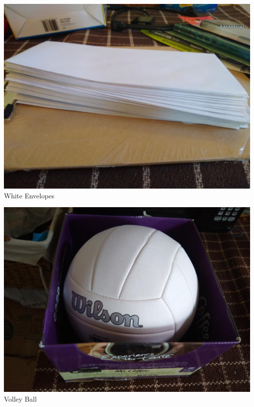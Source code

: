 \documentclass[t]{beamer}
\newcommand{\htarget}[2]{\hypertarget{#1}{#2}}
\begin{document}
\begin{frame}\htarget{envelopes}{} \begin{center}
\includegraphics[height=0.8\textheight]{white_envelope_mini.jpg} \\
White Envelopes
\end{center} \end{frame}
\begin{frame}\htarget{volleyvall}{} \begin{center}
\includegraphics[height=0.8\textheight]{volleyball_mini.jpg} \\
Volley Ball
\end{center} \end{frame}
\end{document}
